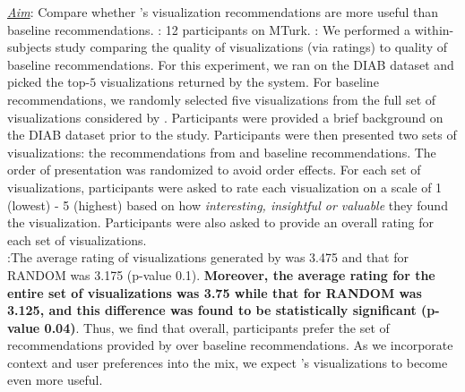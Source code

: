 % 

{\it \underline{Aim}}: Compare whether \SeeDB's visualization 
recommendations 
are more useful than baseline recommendations.
: 12 participants on MTurk.
: We performed a within-subjects study comparing the quality of \SeeDB visualizations (via ratings) to quality of baseline recommendations.
For this experiment, we ran \SeeDB on the DIAB dataset and picked the top-$5$ visualizations returned by the system.
For baseline recommendations, we randomly selected five visualizations from
the full set of visualizations considered by \SeeDB.
Participants were provided a brief background on the DIAB dataset prior to the study.
Participants were then presented two sets of visualizations: the recommendations from \SeeDB and baseline recommendations. 
The order of presentation was randomized to avoid order effects.
For each set of visualizations, participants were asked to rate each visualization on a scale of 1 (lowest) - 5 (highest) based on how {\it interesting, insightful or valuable} they found the visualization.
Participants were also asked to provide an overall rating for each set of visualizations.\\
:The average rating of visualizations generated by \SeeDB was 3.475 and that for RANDOM was 3.175 (p-value 0.1).
{\bf Moreover, the average rating for the entire set of \SeeDB visualizations was 3.75 while that for RANDOM was 3.125, and this difference was found to be statistically significant (p-value 0.04)}. 
Thus, we find that overall, participants prefer the set of recommendations provided by \SeeDB over baseline recommendations. 
As we incorporate context and user preferences
into the mix, we expect \SeeDB's visualizations
to become even more useful.

